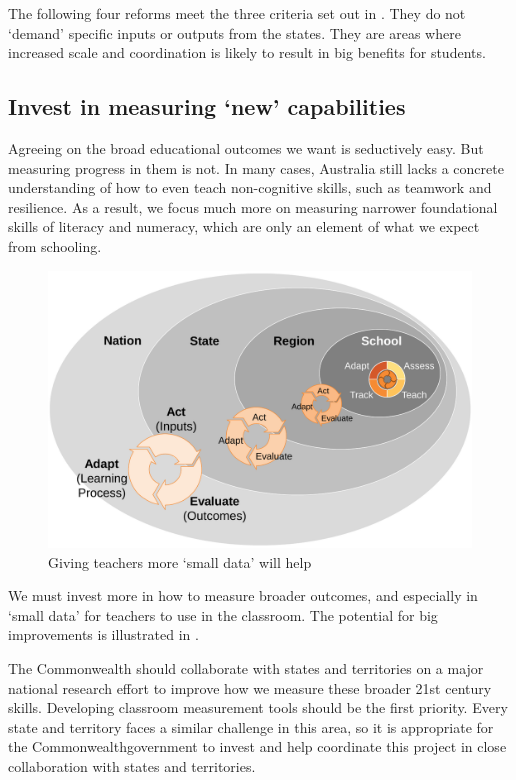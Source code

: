 The following four reforms meet the three criteria set out in . They do not `demand' specific inputs or outputs from the states. They are areas where increased scale and coordination is likely to result in big benefits for students. 
 
\subsection{Invest in measuring `new' capabilities}\label{subsec:new-capabilities}

Agreeing on the broad educational outcomes we want is seductively easy. But measuring progress in them is not. In many cases, Australia still lacks a concrete understanding of how to even teach non-cognitive skills, such as teamwork and resilience. As a result, we focus much more on measuring narrower foundational skills of literacy and numeracy, which are only an element of what we expect from schooling.

\begin{figure}
\caption{Giving teachers more `small data' will help}\label{fig:improve-how-to-measure}
\includegraphics[page=4]{charts/GonskiReportCharts.pdf}
\end{figure}

We must invest more in how to measure broader outcomes, and especially in `small data' for teachers to use in the classroom. The potential for big improvements is illustrated in . 

The Commonwealth should collaborate with states and territories on a major national research effort to improve how we measure these broader 21st century skills. Developing classroom measurement tools should be the first priority.  Every state and territory faces a similar challenge in this area, so it is appropriate for the Commonwealth\space government to invest and help coordinate this project in close collaboration with states and territories.


